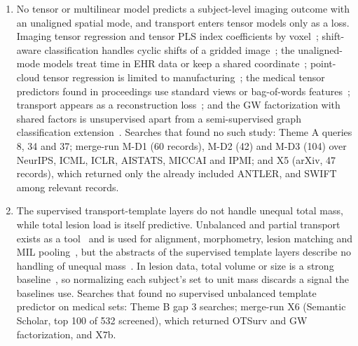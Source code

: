 \documentclass[journal,onecolumn]{IEEEtran}
\begin{document}
\begin{enumerate}
\item{} No tensor or multilinear model predicts a subject-level imaging outcome with an unaligned spatial mode, and transport enters tensor models only as a loss. Imaging tensor regression and tensor PLS index coefficients by voxel~\cite{Zhou2013Tensor,Guhaniyogi2017Bayesian,Li2017Parsimonious,Zhang2017Envelope,Spencer2024Bayesian}; shift-aware classification handles cyclic shifts of a gridded image~\cite{Huang2026ShiftAware}; the unaligned-mode models treat time in EHR data or keep a shared coordinate~\cite{Ren2023MULTIPAR,Konyar2025SemiSupervised,Patalano2026PAR2COX,Tang2026Unaligned,Hu2026Ragged}; point-cloud tensor regression is limited to manufacturing~\cite{Yan2019Structured,Biehler2024ANTLER}; the medical tensor predictors found in proceedings use standard views or bag-of-words features~\cite{Tripathi2023Tensor,Adeli2017Joint}; transport appears as a reconstruction loss~\cite{Afshar2021SWIFT}; and the GW factorization with shared factors is unsupervised apart from a semi-supervised graph classification extension~\cite{Xu2023Representing}. Searches that found no such study: Theme A queries 8, 34 and 37; merge-run M-D1 (60 records), M-D2 (42) and M-D3 (104) over NeurIPS, ICML, ICLR, AISTATS, MICCAI and IPMI; and X5 (arXiv, 47 records), which returned only the already included ANTLER, \cite{Yan2019Structured} and SWIFT among relevant records.

\item{} The supervised transport-template layers do not handle unequal total mass, while total lesion load is itself predictive. Unbalanced and partial transport exists as a tool~\cite{Chizat2018Scaling,Sejourne2021Unbalanced,Bai2023Linear,Bai2025Linear} and is used for alignment, morphometry, lesion matching and MIL pooling~\cite{Thual2022Aligning,Gerber2018Exploratory,Qahqaie2026Unbalanced,Ren2025OTSurv}, but the abstracts of the supervised template layers describe no handling of unequal mass~\cite{VincentCuaz2022Template,Mialon2021Trainable,Kolouri2021Wasserstein}. In lesion data, total volume or size is a strong baseline~\cite{Geady2025Radiomic,Janse2026Deep,Sperber2023Stroke,Kendrick2022Fully}, so normalizing each subject's set to unit mass discards a signal the baselines use. Searches that found no supervised unbalanced template predictor on medical sets: Theme B gap 3 searches; merge-run X6 (Semantic Scholar, top 100 of 532 screened), which returned OTSurv and GW factorization, and X7b.


\end{enumerate}
\end{document}
